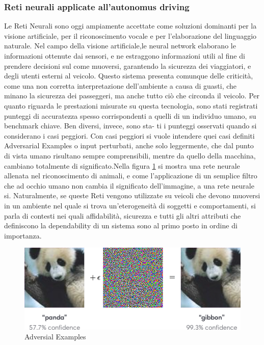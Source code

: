 \documentclass[14pt]{extarticle}
\begin{document}
\subsubsection{Reti neurali applicate all'autonomus driving}
Le Reti Neurali sono oggi ampiamente accettate come soluzioni dominanti per la visione artificiale, per il riconoscimento vocale e per l'elaborazione del linguaggio naturale. Nel campo della visione artificiale,le neural network elaborano le informazioni ottenute dai sensori, e ne estraggono informazioni utili al fine di prendere decisioni sul come muoversi, garantendo la sicurezza dei viaggiatori, e degli utenti esterni al veicolo. 
Questo sistema presenta comunque delle criticità, come una non corretta interpretazione dell'ambiente a causa di guasti, che minano la sicurezza dei passeggeri, ma anche tutto ciò che circonda il veicolo.%
Per quanto riguarda le prestazioni misurate su questa tecnologia, sono stati
registrati punteggi di accuratezza spesso corrispondenti a quelli di un
individuo umano, su benchmark chiave. Ben diversi, invece, sono sta-
ti i punteggi osservati quando si considerano i casi peggiori. Con casi
peggiori si vuole intendere quei casi definiti Adversarial Examples \cite{engstrom2019exploring} o
input perturbati, anche solo leggermente, che dal punto di vista umano
risultano sempre comprensibili, mentre da quello della macchina, cambiano totalmente di significato.Nella figura \ref{fig:AdvExp} si mostra una rete neurale allenata nel riconoscimento di animali, e come l'applicazione di un semplice filtro che ad occhio umano non cambia il significato dell'immagine, a una rete neurale si.
Naturalmente, se queste Reti vengono
utilizzate su veicoli che devono muoversi in un ambiente nel quale si
trova un'eterogeneità di soggetti e comportamenti, si parla di contesti
nei quali affidabilità, sicurezza e tutti gli altri attributi che definiscono la
dependability di un sistema sono al primo posto in ordine di importanza.
	\begin{figure}
	\centering
	\includegraphics[scale=0.8]{adversarial_img.png}
	\caption{Adversial Examples}
	\label{fig:AdvExp}
	\end{figure}
\end{document}
